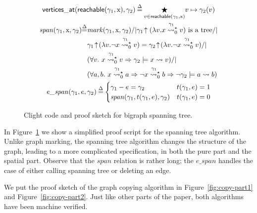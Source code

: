 \documentclass[acmsmall,review,anonymous]{acmart}\settopmatter{printfolios=true,printccs=false,printacmref=false}
\newcommand{\defeq}{\mathbin{\stackrel{\Delta}{=}}}
\newcommand{\tx}[1]{\text{#1}}
\newcommand{\p}[1]{\ensuremath{\mathsf{#1}}} \newcommand{\m}[1]{\ensuremath{\mathit{#1}}} \newcommand{\ma}[1]{\ensuremath{\mathcal{#1}}} \let\ramify\lightning
\begin{document}
\begin{figure}[t]
\begin{lstlisting}
  \end{lstlisting}
  \small
\begin{gather*}
  \p{vertices\_at}(\p{reachable}(\gamma_1, \tx x), \gamma_2)\defeq \underset{v\in\p{reachable}(\gamma_1, \tx x)}{\bigstar}v \mapsto \gamma_2(v)\\
  \begin{split}
  \m{span}(\gamma_1, \tx x, \gamma_2)\defeq &\m{mark}(\gamma_1,\tx x, \gamma_2) /| \gamma_1\!\uparrow(\lambda v. x\mathrel{{\stackrel{\gamma_1~}{\leadsto^{\star}_{0}}}} v) \text{ is a tree} /| \null\\
  & \gamma_1\!\uparrow\!(\lambda v.\neg x\mathrel{{\stackrel{\gamma_1~}{\leadsto^{\star}_{0}}}} v) = \gamma_2\!\uparrow\!(\lambda v.\neg x\mathrel{{\stackrel{\gamma_1~}{\leadsto^{\star}_{0}}}} v) /| \null\\
  & (\forall v.~x\mathrel{{\stackrel{\gamma_1~}{\leadsto^{\star}_{0}}}} v => \gamma_2\models x \leadsto v) /| \null\\
  & (\forall a,b.~x\mathrel{{\stackrel{\gamma_1~}{\leadsto^{\star}_{0}}}} a => \neg x\mathrel{{\stackrel{\gamma_1~}{\leadsto^{\star}_{0}}}} b => \neg \gamma_2\models a \leadsto b)\\
  \end{split}\\
  \m{e\_span}(\gamma_1, e, \gamma_2)\defeq
  \begin{cases}
    \gamma_1 - e = \gamma_2  & t(\gamma_1,e)=1\\
    \m{span}(\gamma_1, t(\gamma_1,e), \gamma_2) & t(\gamma_1,e)=0\\
  \end{cases}
\end{gather*}
\caption{Clight code and proof sketch for bigraph spanning tree.}
\label{fig:spanning}

\end{figure}
 
In Figure~\ref{fig:spanning} we show a simplified proof script for
the spanning tree algorithm.  Unlike graph marking, the spanning tree algorithm changes the
structure of the graph, leading to a more complicated specification,
in both the pure part and the spatial part. Observe that the $\m{span}$ relation is
rather long; the $\m{e\_span}$ handles the case of either calling spanning tree or deleting an edge.

We put the proof sketch of the graph copying algorithm in
Figure~\ref{fig:copy-part1} and Figure~\ref{fig:copy-part2}. Just like
other parts of the paper, both algorithms have been machine verified.
\end{document}
